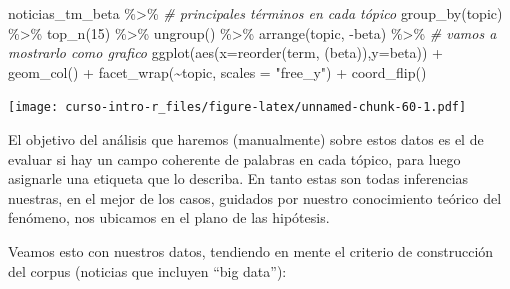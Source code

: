 \documentclass[
]{book}
\newenvironment{Shaded}{\begin{snugshade}}{\end{snugshade}}
\newcommand{\AttributeTok}[1]{\textcolor[rgb]{0.77,0.63,0.00}{#1}}
\newcommand{\CommentTok}[1]{\textcolor[rgb]{0.56,0.35,0.01}{\textit{#1}}}
\newcommand{\DecValTok}[1]{\textcolor[rgb]{0.00,0.00,0.81}{#1}}
\newcommand{\FunctionTok}[1]{\textcolor[rgb]{0.00,0.00,0.00}{#1}}
\newcommand{\NormalTok}[1]{#1}
\newcommand{\SpecialCharTok}[1]{\textcolor[rgb]{0.00,0.00,0.00}{#1}}
\newcommand{\StringTok}[1]{\textcolor[rgb]{0.31,0.60,0.02}{#1}}
\begin{document}
\begin{Shaded}
\begin{Highlighting}[]
\NormalTok{noticias\_tm\_beta }\SpecialCharTok{\%\textgreater{}\%} \CommentTok{\# principales términos en cada tópico}
  \FunctionTok{group\_by}\NormalTok{(topic) }\SpecialCharTok{\%\textgreater{}\%}
  \FunctionTok{top\_n}\NormalTok{(}\DecValTok{15}\NormalTok{) }\SpecialCharTok{\%\textgreater{}\%}
  \FunctionTok{ungroup}\NormalTok{() }\SpecialCharTok{\%\textgreater{}\%}
  \FunctionTok{arrange}\NormalTok{(topic, }\SpecialCharTok{{-}}\NormalTok{beta) }\SpecialCharTok{\%\textgreater{}\%} \CommentTok{\# vamos a mostrarlo como grafico}
  \FunctionTok{ggplot}\NormalTok{(}\FunctionTok{aes}\NormalTok{(}\AttributeTok{x=}\FunctionTok{reorder}\NormalTok{(term, (beta)),}\AttributeTok{y=}\NormalTok{beta)) }\SpecialCharTok{+} 
    \FunctionTok{geom\_col}\NormalTok{() }\SpecialCharTok{+}
    \FunctionTok{facet\_wrap}\NormalTok{(}\SpecialCharTok{\textasciitilde{}}\NormalTok{topic, }\AttributeTok{scales =} \StringTok{"free\_y"}\NormalTok{) }\SpecialCharTok{+}
  \FunctionTok{coord\_flip}\NormalTok{()}
\end{Highlighting}
\end{Shaded}

\texttt{[image: curso-intro-r\_files/figure-latex/unnamed-chunk-60-1.pdf]}

El objetivo del análisis que haremos (manualmente) sobre estos datos es el de evaluar si hay un campo coherente de palabras en cada tópico, para luego asignarle una etiqueta que lo describa. En tanto estas son todas inferencias nuestras, en el mejor de los casos, guidados por nuestro conocimiento teórico del fenómeno, nos ubicamos en el plano de las hipótesis.

Veamos esto con nuestros datos, tendiendo en mente el criterio de construcción del corpus (noticias que incluyen ``big data''):
\end{document}
